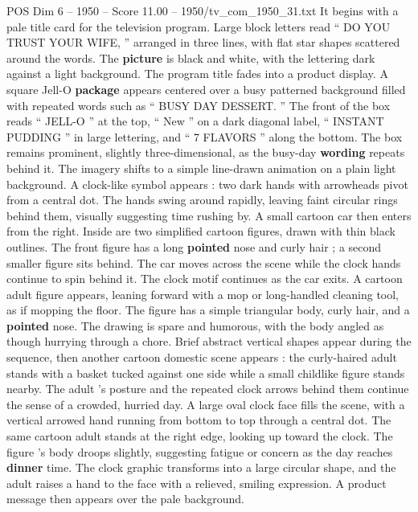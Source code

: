 \begin{textsample}{POS Dim 6 – 1950 – Score 11.00 – 1950/tv\_com\_1950\_31.txt}  \label{ex:f6_pos_015}
It begins with a pale title card for the television program.
Large block letters read “ DO YOU TRUST YOUR WIFE, ” arranged in three lines, with flat star shapes scattered around the words.
The \textbf{picture} is black and white, with the lettering dark against a light background.
The program title fades into a product display.
A square Jell-O \textbf{package} appears centered over a busy patterned background filled with repeated words such as “ BUSY DAY DESSERT. ” The front of the box reads “ JELL-O ” at the top, “ New ” on a dark diagonal label, “ INSTANT PUDDING ” in large lettering, and “ 7 FLAVORS ” along the bottom.
The box remains prominent, slightly three-dimensional, as the busy-day \textbf{wording} repeats behind it.
The imagery shifts to a simple line-drawn animation on a plain light background.
A clock-like symbol appears : two dark hands with arrowheads pivot from a central dot.
The hands swing around rapidly, leaving faint circular rings behind them, visually suggesting time rushing by.
A small cartoon car then enters from the right.
Inside are two simplified cartoon figures, drawn with thin black outlines.
The front figure has a long \textbf{pointed} nose and curly hair ; a second smaller figure sits behind.
The car moves across the scene while the clock hands continue to spin behind it.
The clock motif continues as the car exits.
A cartoon adult figure appears, leaning forward with a mop or long-handled cleaning tool, as if mopping the floor.
The figure has a simple triangular body, curly hair, and a \textbf{pointed} nose.
The drawing is spare and humorous, with the body angled as though hurrying through a chore.
Brief abstract vertical shapes appear during the sequence, then another cartoon domestic scene appears : the curly-haired adult stands with a basket tucked against one side while a small childlike figure stands nearby.
The adult ’s posture and the repeated clock arrows behind them continue the sense of a crowded, hurried day.
A large oval clock face fills the scene, with a vertical arrowed hand running from bottom to top through a central dot.
The same cartoon adult stands at the right edge, looking up toward the clock.
The figure ’s body droops slightly, suggesting fatigue or concern as the day reaches \textbf{dinner} time.
The clock graphic transforms into a large circular shape, and the adult raises a hand to the face with a relieved, smiling expression.
A product message then appears over the pale background.

\end{textsample}
